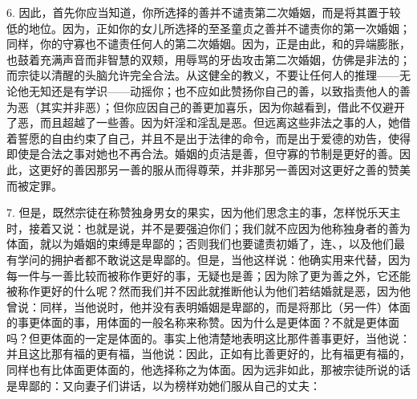 6. 因此，首先你应当知道，你所选择的善并不谴责第二次婚姻，而是将其置于较低的地位。因为，正如你的女儿所选择的至圣童贞之善并不谴责你的第一次婚姻；同样，你的守寡也不谴责任何人的第二次婚姻。因为，正是由此，和的异端膨胀，也鼓着充满声音而非智慧的双颊，用辱骂的牙齿攻击第二次婚姻，仿佛是非法的；而宗徒以清醒的头脑允许完全合法。从这健全的教义，不要让任何人的推理——无论他无知还是有学识——动摇你；也不应如此赞扬你自己的善，以致指责他人的善为恶（其实并非恶）；但你应因自己的善更加喜乐，因为你越看到，借此不仅避开了恶，而且超越了一些善。因为奸淫和淫乱是恶。但远离这些非法之事的人，她借着誓愿的自由约束了自己，并且不是出于法律的命令，而是出于爱德的劝告，使得即使是合法之事对她也不再合法。婚姻的贞洁是善，但守寡的节制是更好的善。因此，这更好的善因那另一善的服从而得尊荣，并非那另一善因对这更好之善的赞美而被定罪。\par

7. 但是，既然宗徒在称赞独身男女的果实，因为他们思念主的事，怎样悦乐天主时，接着又说：也就是说，并不是要强迫你们；我们就不应因为他称独身者的善为体面，就以为婚姻的束缚是卑鄙的；否则我们也要谴责初婚了，连、，以及他们最有学问的拥护者都不敢说这是卑鄙的。但是，当他这样说：他确实用来代替，因为每一件与一善比较而被称作更好的事，无疑也是善；因为除了更为善之外，它还能被称作更好的什么呢？然而我们并不因此就推断他认为他们若结婚就是恶，因为他曾说：同样，当他说时，他并没有表明婚姻是卑鄙的，而是将那比（另一件）体面的事更体面的事，用体面的一般名称来称赞。因为什么是更体面？不就是更体面吗？但更体面的一定是体面的。事实上他清楚地表明这比那件善事更好，当他说：并且这比那有福的更有福，当他说：因此，正如有比善更好的，比有福更有福的，同样也有比体面更体面的，他选择称之为体面。因为远非如此，那被宗徒所说的话是卑鄙的：又向妻子们讲话，以为榜样劝她们服从自己的丈夫：\par

